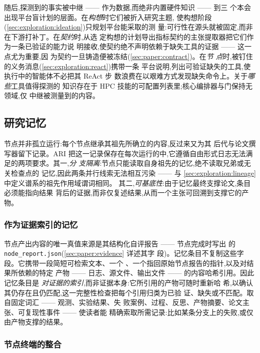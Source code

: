 随后,探测到的事实被中继 —— 作为数据,而绝非内置硬件知识 —— 到三
个本会出现平台盲计划的层面。在\emph{构想}时它们被折入研究主题,
使构想阶段(\cref{sec:exploration:ideation})只规划平台能采取的测
量:可行性在源头就被固定,而非在下游打补丁。在\emph{契约}时,从选
定构想的计划导出指标契约的主张提取器把它们作为一条已验证的能力说
明接收,使契约绝不声明依赖于缺失工具的证据 —— 这一点尤为重要,因
为契约一旦铸造便被冻结(\cref{sec:paper:contract})。在\emph{节
点}时,被钉住的义务消息(\cref{sec:exploration:react})携带一条
平台说明,列出可验证缺失的工具,使执行中的智能体不必把其 ReAct 步
数浪费在以艰难方式发现缺失命令上。关于\emph{哪些}工具值得探测的
知识存在于 HPC 技能的可配置列表里;核心编排器与门保持无领域,仅
中继被测量到的内容。

\subsection{研究记忆}\label{sec:exploration:memory}

节点并非孤立运行:每个节点继承其祖先所确立的内容,反过来又为其
后代与论文撰写器留下记录。ARI 把这一记录保存在每次运行的中,它遵循自由形式日志无法满足的两项要求。其一,\emph{分
支隔离}:节点只能读取自身祖先的记忆,绝不读取兄弟或无关检查点的
记忆,因此两条并行线索无法相互污染 —— 与
\cref{sec:exploration:lineage} 中定义谱系的祖先作用域谓词相同。
其二,\emph{可基底性}:由于记忆最终支撑论文,条目必须能指向结果
背后的证据,而非仅复述结果,从而一个主张可回溯到支撑它的产物。

\subsubsection*{作为证据索引的记忆}

节点产出内容的唯一真值来源是其结构化自评报告 —— 节点完成时写出
的 \texttt{node\_report.json}(\cref{sec:paper:evidence} 详述其字
段)。记忆条目不复制这些字段。它携带一段简短可检索文本、一个
、一个指回原始节点报告的指针,以及对结果所依赖的特定
产物 —— 日志、源文件、输出文件 —— 的内容哈希引用。因此记忆条目是
\emph{对证据的索引},而非证据本身:它所引用的产物可随时重新哈
希,以确认其仍存在且仍匹配,这一完整性检查把每个引用归类为已验
证、缺失或不匹配。取自固定词汇 —— 观测、实验结果、失
败案例、过程、反思、产物摘要、论文主张、可复现性事件 —— 使读者能
精确索取所需记录:比如某条分支上的失败,或仅由产物支撑的结果。

\subsubsection*{节点终端的整合}

